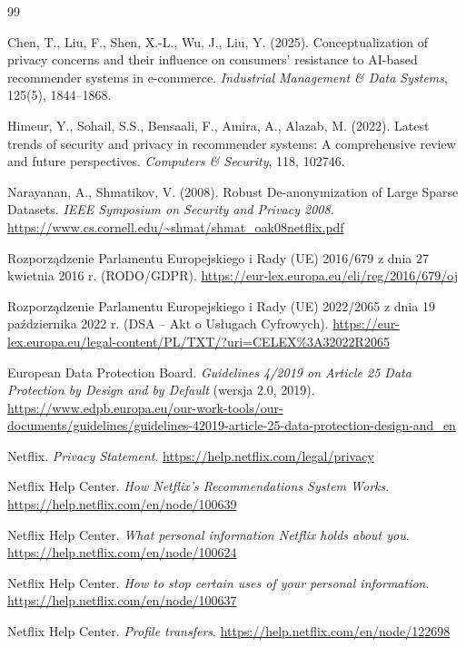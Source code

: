 \documentclass[12pt, a4paper]{article}
\begin{document}
\begin{thebibliography}{99}

Chen, T., Liu, F., Shen, X.-L., Wu, J., Liu, Y. (2025). Conceptualization of privacy concerns and their influence on consumers' resistance to AI-based recommender systems in e-commerce. \textit{Industrial Management \& Data Systems}, 125(5), 1844--1868.

Himeur, Y., Sohail, S.S., Bensaali, F., Amira, A., Alazab, M. (2022). Latest trends of security and privacy in recommender systems: A comprehensive review and future perspectives. \textit{Computers \& Security}, 118, 102746.

Narayanan, A., Shmatikov, V. (2008). Robust De-anonymization of Large Sparse Datasets. \textit{IEEE Symposium on Security and Privacy 2008}. \url{https://www.cs.cornell.edu/~shmat/shmat_oak08netflix.pdf}

Rozporządzenie Parlamentu Europejskiego i Rady (UE) 2016/679 z dnia 27 kwietnia 2016 r. (RODO/GDPR). \url{https://eur-lex.europa.eu/eli/reg/2016/679/oj}

Rozporządzenie Parlamentu Europejskiego i Rady (UE) 2022/2065 z dnia 19 października 2022 r. (DSA -- Akt o Usługach Cyfrowych). \url{https://eur-lex.europa.eu/legal-content/PL/TXT/?uri=CELEX\%3A32022R2065}

European Data Protection Board. \textit{Guidelines 4/2019 on Article 25 Data Protection by Design and by Default} (wersja 2.0, 2019). \url{https://www.edpb.europa.eu/our-work-tools/our-documents/guidelines/guidelines-42019-article-25-data-protection-design-and_en}

Netflix. \textit{Privacy Statement}. \url{https://help.netflix.com/legal/privacy}

Netflix Help Center. \textit{How Netflix's Recommendations System Works}. \url{https://help.netflix.com/en/node/100639}

Netflix Help Center. \textit{What personal information Netflix holds about you}. \url{https://help.netflix.com/en/node/100624}

Netflix Help Center. \textit{How to stop certain uses of your personal information}. \url{https://help.netflix.com/en/node/100637}

Netflix Help Center. \textit{Profile transfers}. \url{https://help.netflix.com/en/node/122698}


\end{thebibliography}
\end{document}
